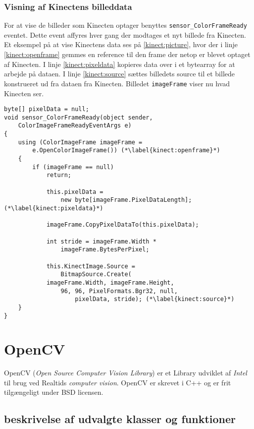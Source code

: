 \subsubsection{Visning af Kinectens billeddata}
For at vise de billeder som Kinecten optager benyttes \lstinline[style=csharp]!sensor_ColorFrameReady! eventet. 
Dette event affyres hver gang der modtages et nyt billede fra Kinecten. 
Et eksempel på at vise Kinectens data ses på \cref{kinect:picture}, hvor der i linje \ref{kinect:openframe} gemmes en reference til den frame der netop er blevet optaget af Kinecten.
I linje \ref{kinect:pixeldata} kopieres data over i et bytearray for at arbejde på dataen. 
I linje \ref{kinect:source} sættes billedets source til et billede konstrueret ud fra dataen fra Kinecten.
Billedet \lstinline[style=csharp]|imageFrame| viser nu hvad Kinecten ser.

\begin{lstlisting}[style=csharp,caption={Visning af billeddata fra Kinectens RGB-kamera}, label=kinect:picture]
byte[] pixelData = null;
void sensor_ColorFrameReady(object sender,
	ColorImageFrameReadyEventArgs e)
{
    using (ColorImageFrame imageFrame = 
    	e.OpenColorImageFrame()) (*\label{kinect:openframe}*)
    {
        if (imageFrame == null)
            return;

            this.pixelData = 
            	new byte[imageFrame.PixelDataLength];(*\label{kinect:pixeldata}*)

            imageFrame.CopyPixelDataTo(this.pixelData);

            int stride = imageFrame.Width *
            	imageFrame.BytesPerPixel;

            this.KinectImage.Source = 
            	BitmapSource.Create(
            imageFrame.Width, imageFrame.Height, 
            	96, 96, PixelFormats.Bgr32, null, 
            		pixelData, stride); (*\label{kinect:source}*)
    }
}    
\end{lstlisting}




\section{OpenCV}
OpenCV (\emph{Open Source Computer Vision Library}) er et Library udviklet af \emph{Intel}
til brug ved Realtids \emph{computer vision}.
OpenCV er skrevet i C++ og er frit tilgængeligt under BSD licensen.

\subsection{beskrivelse af udvalgte klasser og funktioner}

